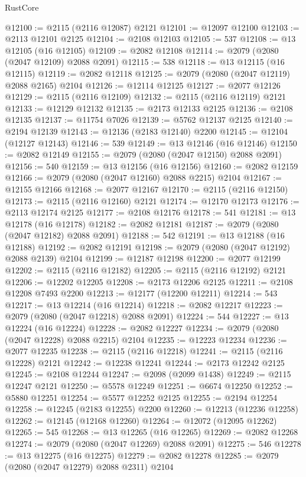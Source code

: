 \begin{lexlean}{RustCore}
\begin{coremodule}
@12100 := @2115 (@2116 @12087) @2121
@12101 := @12097 @12100
@12103 := @2113 @12101 @2125
@12104 := @2108 @12103
@12105 := 537
@12108 := @13 @12105 (@16 @12105)
@12109 := @2082 @12108
@12114 := @2079 (@2080 (@2047 @12109) @2088 @2091)
@12115 := 538
@12118 := @13 @12115 (@16 @12115)
@12119 := @2082 @12118
@12125 := @2079 (@2080 (@2047 @12119) @2088 @2165) @2104
@12126 := @12114 @12125
@12127 := @2077 @12126
@12129 := @2115 (@2116 @12109)
@12132 := @2115 (@2116 @12119) @2121
@12133 := @12129 @12132
@12135 := @2173 @12133 @2125
@12136 := @2108 @12135
@12137 := @11754 @7026
@12139 := @5762 @12137 @2125
@12140 := @2194 @12139
@12143 := @12136 (@2183 @12140) @2200
@12145 := @12104 (@12127 @12143)
@12146 := 539
@12149 := @13 @12146 (@16 @12146)
@12150 := @2082 @12149
@12155 := @2079 (@2080 (@2047 @12150) @2088 @2091)
@12156 := 540
@12159 := @13 @12156 (@16 @12156)
@12160 := @2082 @12159
@12166 := @2079 (@2080 (@2047 @12160) @2088 @2215) @2104
@12167 := @12155 @12166
@12168 := @2077 @12167
@12170 := @2115 (@2116 @12150)
@12173 := @2115 (@2116 @12160) @2121
@12174 := @12170 @12173
@12176 := @2113 @12174 @2125
@12177 := @2108 @12176
@12178 := 541
@12181 := @13 @12178 (@16 @12178)
@12182 := @2082 @12181
@12187 := @2079 (@2080 (@2047 @12182) @2088 @2091)
@12188 := 542
@12191 := @13 @12188 (@16 @12188)
@12192 := @2082 @12191
@12198 := @2079 (@2080 (@2047 @12192) @2088 @2139) @2104
@12199 := @12187 @12198
@12200 := @2077 @12199
@12202 := @2115 (@2116 @12182)
@12205 := @2115 (@2116 @12192) @2121
@12206 := @12202 @12205
@12208 := @2173 @12206 @2125
@12211 := @2108 @12208 @7493 @2200
@12213 := @12177 (@12200 @12211)
@12214 := 543
@12217 := @13 @12214 (@16 @12214)
@12218 := @2082 @12217
@12223 := @2079 (@2080 (@2047 @12218) @2088 @2091)
@12224 := 544
@12227 := @13 @12224 (@16 @12224)
@12228 := @2082 @12227
@12234 := @2079 (@2080 (@2047 @12228) @2088 @2215) @2104
@12235 := @12223 @12234
@12236 := @2077 @12235
@12238 := @2115 (@2116 @12218)
@12241 := @2115 (@2116 @12228) @2121
@12242 := @12238 @12241
@12244 := @2173 @12242 @2125
@12245 := @2108 @12244
@12247 := @2098 (@2099 @1438)
@12249 := @2115 @12247 @2121
@12250 := @5578 @12249
@12251 := @6674 @12250
@12252 := @5880 @12251
@12254 := @5577 @12252 @2125
@12255 := @2194 @12254
@12258 := @12245 (@2183 @12255) @2200
@12260 := @12213 (@12236 @12258)
@12262 := @12145 (@12168 @12260)
@12264 := @12072 (@12095 @12262)
@12265 := 545
@12268 := @13 @12265 (@16 @12265)
@12269 := @2082 @12268
@12274 := @2079 (@2080 (@2047 @12269) @2088 @2091)
@12275 := 546
@12278 := @13 @12275 (@16 @12275)
@12279 := @2082 @12278
@12285 := @2079 (@2080 (@2047 @12279) @2088 @2311) @2104

\end{coremodule}
\end{lexlean}

